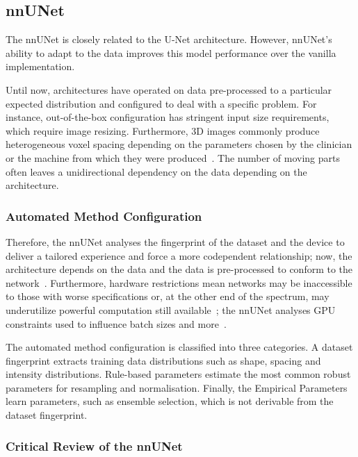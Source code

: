 \documentclass[11pt,twoside]{report}
\begin{document}
\subsection{nnUNet}\label{sect:nnunet}

The nnUNet is closely related to the U-Net architecture. However, nnUNet's ability to adapt to the data improves this model performance over the vanilla implementation.

Until now, architectures have operated on data pre-processed to a particular expected distribution and configured to deal with a specific problem. For instance, out-of-the-box configuration has stringent input size requirements, which require image resizing. Furthermore, 3D images commonly produce heterogeneous voxel spacing depending on the parameters chosen by the clinician or the machine from which they were produced~\cite{nnunet}. The number of moving parts often leaves a unidirectional dependency on the data depending on the architecture. 

\subsubsection{Automated Method Configuration}\label{sect:nnunet-automated-method-configuration}

Therefore, the nnUNet analyses the fingerprint of the dataset and the device to deliver a tailored experience and force a more codependent relationship; now, the architecture depends on the data and the data is pre-processed to conform to the network~\cite{nnunet}. Furthermore, hardware restrictions mean networks may be inaccessible to those with worse specifications or, at the other end of the spectrum, may underutilize powerful computation still available~\cite{nnunet}; the nnUNet analyses GPU constraints used to influence batch sizes and more~\cite{nnunet-git-paper}.

The automated method configuration is classified into three categories. A dataset fingerprint extracts training data distributions such as shape, spacing and intensity distributions. Rule-based parameters estimate the most common robust parameters for resampling and normalisation. Finally, the Empirical Parameters learn parameters, such as ensemble selection, which is not derivable from the dataset fingerprint.

\subsubsection{Critical Review of the nnUNet}
\end{document}
